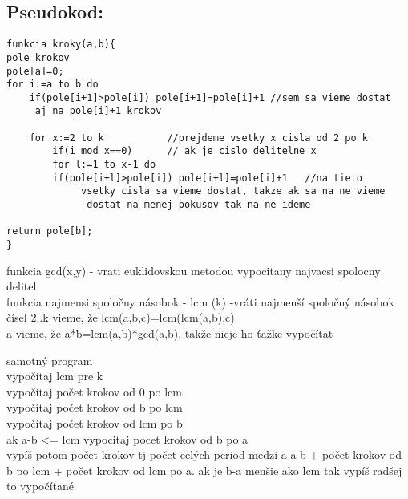 \documentclass[a4paper,11pt]{article}
\begin{document}
\subsection*{Pseudokod:}
\begin{lstlisting}
funkcia kroky(a,b){
pole krokov
pole[a]=0;
for i:=a to b do
	if(pole[i+1]>pole[i]) pole[i+1]=pole[i]+1 //sem sa vieme dostat
	 aj na pole[i]+1 krokov
	
	for x:=2 to k			//prejdeme vsetky x cisla od 2 po k
		if(i mod x==0)		// ak je cislo delitelne x
		for l:=1 to x-1 do
		if(pole[i+l]>pole[i]) pole[i+l]=pole[i]+1	//na tieto
			 vsetky cisla sa vieme dostat, takze ak sa na ne vieme
			  dostat na menej pokusov tak na ne ideme

return pole[b];
}

\end{lstlisting}
funkcia gcd(x,y)  - vrati euklidovskou metodou vypocitany najvacsi spolocny delitel
\\

funkcia najmensi spoločny násobok - lcm (k) -vráti najmenší spoločný násobok čísel 2..k
vieme, že lcm(a,b,c)=lcm(lcm(a,b),c)\\

a vieme, že a*b=lcm(a,b)*gcd(a,b), takže nieje ho ťažke vypočítat


samotný program
\\

vypočítaj lcm pre k\\
vypočítaj počet krokov od 0 po lcm\\
vypočítaj počet krokov od b po lcm\\
vypočítaj počet krokov od lcm po b\\
ak a-b <= lcm vypocitaj pocet krokov od b po a\\
vypíš potom počet krokov tj počet celých period medzi a a b + počet krokov od b po lcm + počet krokov od lcm po a.
ak je b-a menšie ako lcm tak vypíš radšej to vypočítané
\end{document}

